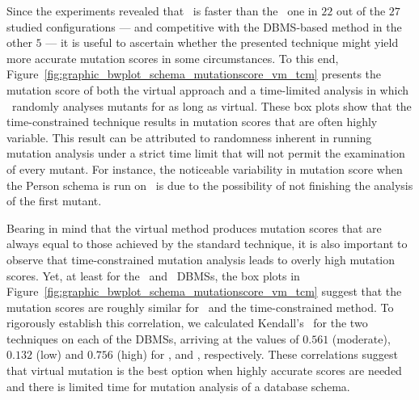 


% 

 Since the experiments revealed that \vma~is faster than the \Original~one in $22$ out of the $27$ studied configurations --- and competitive with the DBMS-based method in the other $5$ --- it is useful to ascertain whether the presented technique might yield more accurate mutation scores in some circumstances. To this end, Figure~\ref{fig:graphic_bwplot_schema_mutationscore_vm_tcm} presents the mutation score of both the virtual approach and a time-limited analysis in which \Original~randomly analyses mutants for as long as virtual. These box plots show that the time-constrained technique results in mutation scores that are often highly variable. This result can be attributed to randomness inherent in running mutation analysis under a strict time limit that will not permit the examination of every mutant. For instance, the noticeable variability in mutation score when the Person schema is run on \Postgres~is due to the possibility of not finishing the analysis of the first mutant.

Bearing in mind that the virtual method produces mutation scores that are always equal to those achieved by the standard technique, it is also important to observe that time-constrained mutation analysis leads to overly high mutation scores.  Yet, at least for the \HyperSQL~and \SQLite~DBMSs, the box plots in Figure~\ref{fig:graphic_bwplot_schema_mutationscore_vm_tcm} suggest that the mutation scores are roughly similar for \vma~and the time-constrained method. To rigorously establish this correlation, we calculated Kendall's \taub~for the two techniques on each of the DBMSs, arriving at the values of $0.561$ (moderate), $0.132$ (low) and $0.756$ (high) for \HyperSQL, \PostgreSQL and \sqlite, respectively. These correlations suggest that virtual mutation is the best option when highly accurate scores are needed and there is limited time for mutation analysis of a database schema.



